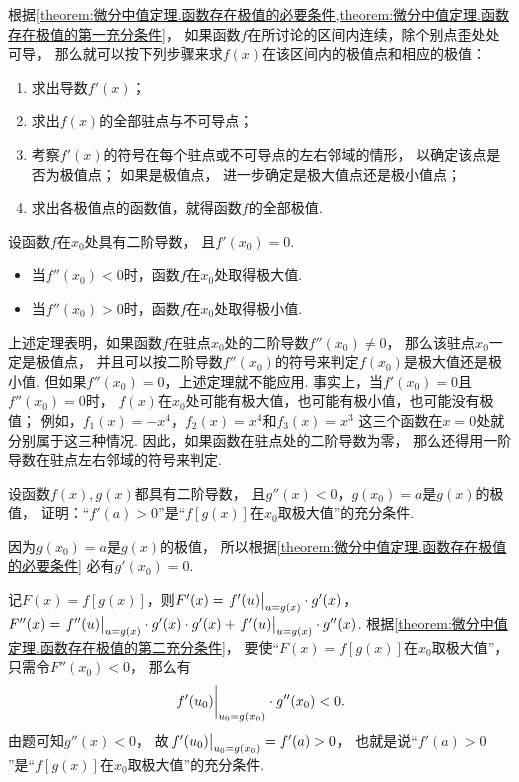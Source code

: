 根据\cref{theorem:微分中值定理.函数存在极值的必要条件,theorem:微分中值定理.函数存在极值的第一充分条件}，
如果函数\(f\)在所讨论的区间内连续，除个别点歪处处可导，
那么就可以按下列步骤来求\(f(x)\)在该区间内的极值点和相应的极值：
\begin{enumerate}
	\item 求出导数\(f'(x)\)；
	\item 求出\(f(x)\)的全部驻点与不可导点；
	\item 考察\(f'(x)\)的符号在每个驻点或不可导点的左右邻域的情形，
	以确定该点是否为极值点；
	如果是极值点，
	进一步确定是极大值点还是极小值点；
	\item 求出各极值点的函数值，就得函数\(f\)的全部极值.
\end{enumerate}

\begin{theorem}[函数存在极值的第二充分条件]\label{theorem:微分中值定理.函数存在极值的第二充分条件}
设函数\(f\)在\(x_0\)处具有二阶导数，
且\(f'(x_0)=0\).
\begin{itemize}
	\item 当\(f''(x_0)<0\)时，函数\(f\)在\(x_0\)处取得极大值.
	\item 当\(f''(x_0)>0\)时，函数\(f\)在\(x_0\)处取得极小值.
\end{itemize}
\end{theorem}
上述定理表明，如果函数\(f\)在驻点\(x_0\)处的二阶导数\(f''(x_0)\neq0\)，
那么该驻点\(x_0\)一定是极值点，
并且可以按二阶导数\(f''(x_0)\)的符号来判定\(f(x_0)\)是极大值还是极小值.
但如果\(f''(x_0)=0\)，上述定理就不能应用.
事实上，当\(f'(x_0)=0\)且\(f''(x_0)=0\)时，
\(f(x)\)在\(x_0\)处可能有极大值，也可能有极小值，也可能没有极值；
例如，\(f_1(x) = -x^4\)，\(f_2(x) = x^4\)和\(f_3(x) = x^3\)
这三个函数在\(x=0\)处就分别属于这三种情况.
因此，如果函数在驻点处的二阶导数为零，
那么还得用一阶导数在驻点左右邻域的符号来判定.

\begin{example}
设函数\(f(x),g(x)\)都具有二阶导数，
且\(g''(x)<0\)，\(g(x_0)=a\)是\(g(x)\)的极值，
证明：“\(f'(a)>0\)”是“\(f[g(x)]\)在\(x_0\)取极大值”的充分条件.
\begin{solution}
因为\(g(x_0)=a\)是\(g(x)\)的极值，
所以根据\cref{theorem:微分中值定理.函数存在极值的必要条件}
必有\(g'(x_0)=0\).

记\(F(x) = f[g(x)]\)，则\(F'(x) = \eval{f'(u)}_{u=g(x)} \cdot g'(x)\)，
\(F''(x) = \eval{f''(u)}_{u=g(x)} \cdot g'(x) \cdot g'(x)
+ \eval{f'(u)}_{u=g(x)} \cdot g''(x)\).
根据\cref{theorem:微分中值定理.函数存在极值的第二充分条件}，
要使“\(F(x)=f[g(x)]\)在\(x_0\)取极大值”，只需令\(F''(x_0) < 0\)，
那么有\begin{equation*}
	\eval{f'(u_0)}_{u_0=g(x_0)} \cdot g''(x_0) < 0.
\end{equation*}
由题可知\(g''(x)<0\)，
故\(\eval{f'(u_0)}_{u_0=g(x_0)} = f'(a) > 0\)，
也就是说“\(f'(a)>0\)”是“\(f[g(x)]\)在\(x_0\)取极大值”的充分条件.
\end{solution}
\end{example}


